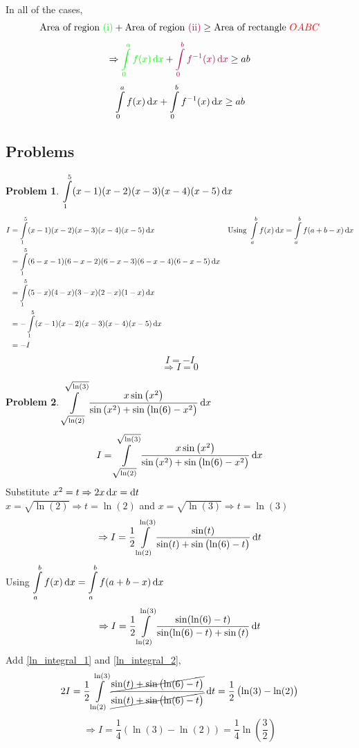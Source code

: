 \documentclass[14]{article}
\theoremstyle{definition}
\newtheorem{prob}{Problem}
\theoremstyle{case}
\begin{document}
In all of the cases,\\
\[\text{Area of region {\color{green}(i)}} + \text{Area of region {\color{purple}(ii)}} \geq \text{Area of rectangle } {\color{red}OABC}\]
\[\Rightarrow {\color{green}\int\limits_0^a f(x) \dif x} + {\color{purple} \int\limits_0^b f^{-1}(x) \dif x} \geq ab\]
\[\int\limits_0^a f(x) \dif x + \int\limits_0^b f^{-1}(x) \dif x \geq ab\]
\begin{flushright}
\qedsymbol
\end{flushright}
\pagebreak
\subsection{Problems}
\begin{prob}
$\displaystyle \int\limits_1^5 (x-1)(x-2)(x-3)(x-4)(x-5) \dif x$
\begin{align*}
I &= \int\limits_1^5 (x-1)(x-2)(x-3)(x-4)(x-5) \dif x && \text{Using } \int\limits_a^bf(x)\dif x = \int\limits_a^b f(a+b-x) \dif x\\
&= \int\limits_1^5 (6-x-1)(6-x-2)(6-x-3)(6-x-4)(6-x-5) \dif x\\
&= \int\limits_1^5 (5-x)(4-x)(3-x)(2-x)(1-x) \dif x\\
&= -\int\limits_1^5 (x-1)(x-2)(x-3)(x-4)(x-5) \dif x\\
&= -I
\end{align*}
\[I = - I\]
\[\Rightarrow I = 0\]
\end{prob}
\begin{prob}
$\displaystyle\int\limits_{\sqrt{\ln(2)}}^{\sqrt{\ln(3)}}\dfrac{x \sin\left( x^2 \right)}{\sin\left(x^2\right) + \sin\left(\ln(6) - x^2 \right)} \dif x$
\[I = \int\limits_{\sqrt{\ln(2)}}^{\sqrt{\ln(3)}}\dfrac{x \sin\left( x^2 \right)}{\sin\left(x^2\right) + \sin\left(\ln(6) - x^2 \right)} \dif x\]
Substitute $x^2 = t \Rightarrow 2x \dif x = \dif t$\\
$x = \sqrt{\ln(2)} \Rightarrow t = \ln(2)$ and $x = \sqrt{\ln(3)} \Rightarrow t = \ln(3)$
\begin{equation}\label{ln_integral_1}
\Rightarrow I =\dfrac12 \int\limits_{\ln(2)}^{\ln(3)} \dfrac{\sin(t)}{\sin(t) + \sin\left(\ln(6) - t \right)} \dif t
\end{equation}
Using $\displaystyle\int\limits_a^b f(x)\dif x = \int\limits_a^b f(a+b-x) \dif x$
\begin{equation}\label{ln_integral_2}
\Rightarrow I =\dfrac12 \int\limits_{\ln(2)}^{\ln(3)} \dfrac{\sin(\ln(6) - t)}{\sin(\ln(6) - t) + \sin\left(t \right)} \dif t
\end{equation}
Add \eqref{ln_integral_1} and \eqref{ln_integral_2},
\[2I = \dfrac12 \int\limits_{\ln(2)}^{\ln(3)} \dfrac{\cancel{\sin(t) + \sin\left(\ln(6) - t\right)}}{\cancel{\sin(t) + \sin\left(\ln(6) - t\right)}} \dif t = \dfrac12\left( \ln(3) - \ln(2) \right)\]
\[\Rightarrow I = \dfrac14 \left(\ln(3) - \ln(2)\right) = \dfrac14 \ln\left(\dfrac32 \right)\]
\end{prob}
\end{document}
